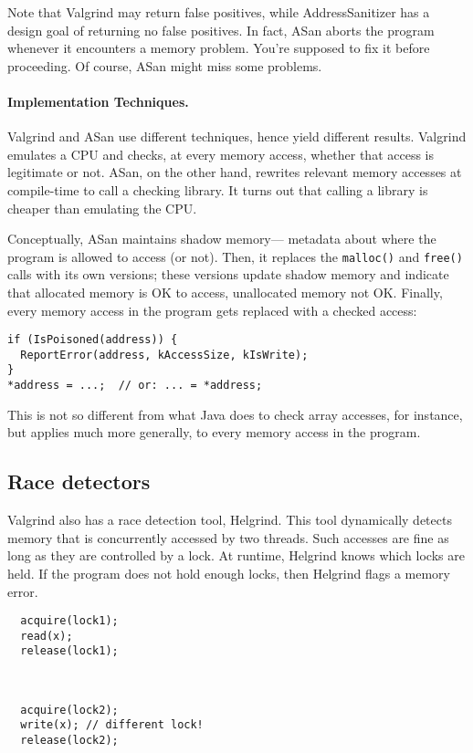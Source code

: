 \documentclass[11pt]{article}
\begin{document}
{Note that Valgrind may return false positives, while AddressSanitizer has a design goal 
of returning no false positives. In fact, ASan aborts the program whenever it encounters
a memory problem. You're supposed to fix it before proceeding. Of course, ASan might miss 
some problems.

\paragraph{Implementation Techniques.}
Valgrind and ASan use different techniques, hence yield different results.
Valgrind emulates a CPU and checks, at every memory access, whether that
access is legitimate or not. ASan, on the other hand, rewrites relevant memory accesses
at compile-time to call a checking library. It turns out that calling a library is cheaper
than emulating the CPU.

Conceptually, ASan maintains shadow memory---
metadata about where the program is allowed to access (or not).
Then, it replaces the {\tt malloc()} and {\tt free()}
calls with its own versions; these versions update shadow memory and indicate
that allocated memory is OK to access, unallocated memory not OK. 
Finally, every memory access in the program gets replaced with a checked access:
\begin{lstlisting}
if (IsPoisoned(address)) {
  ReportError(address, kAccessSize, kIsWrite);
}
*address = ...;  // or: ... = *address;
\end{lstlisting}
This is not so different from what Java does to check array accesses, for instance,
but applies much more generally, to every memory access in the program.

\subsection*{Race detectors}
Valgrind also has a race detection tool, Helgrind. This tool dynamically detects
memory that is concurrently accessed by two threads. Such accesses are fine as long
as they are controlled by a lock. At runtime, Helgrind knows which locks are held.
If the program does not hold enough locks, then Helgrind flags a memory error.

\hspace*{.2\textwidth}\begin{minipage}{.4\textwidth}
\begin{lstlisting}
  acquire(lock1);
  read(x);
  release(lock1);
\end{lstlisting}
\end{minipage}\
\begin{minipage}{.4\textwidth}
\begin{lstlisting}
  acquire(lock2);
  write(x); // different lock!
  release(lock2);
\end{lstlisting}
\end{minipage}

}
\end{document}

